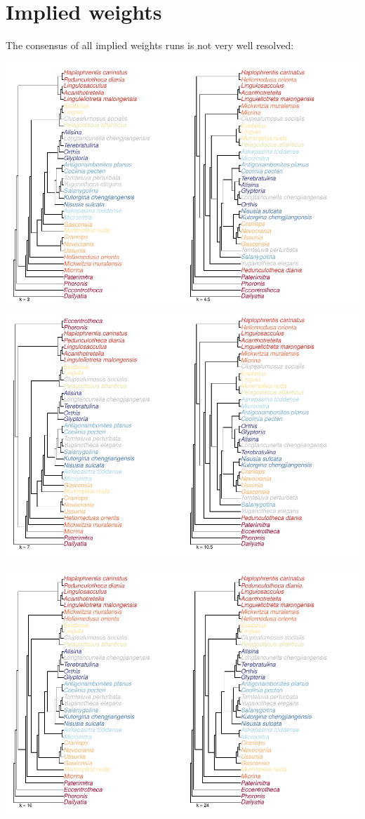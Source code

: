 \documentclass[]{book}
\theoremstyle{definition}
\theoremstyle{definition}
\theoremstyle{definition}
\theoremstyle{remark}
\begin{document}
\hypertarget{implied-weights}{%
\section{Implied weights}\label{implied-weights}}

The consensus of all implied weights runs is not very well resolved:

\includegraphics{Brachiopod_phylogeny_files/figure-latex/unnamed-chunk-7-1.pdf}
\includegraphics{Brachiopod_phylogeny_files/figure-latex/unnamed-chunk-8-1.pdf}

\includegraphics{Brachiopod_phylogeny_files/figure-latex/unnamed-chunk-9-1.pdf}
\end{document}
